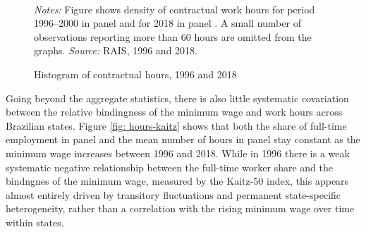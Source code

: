 \begin{figure}[!htb]
  \centering
  \caption{\label{fig: hours}Histogram of contractual hours, 1996 and 2018}
  \prefigvspace
  \\
  \postfigvspace
  \begin{minipage}[t]{1\columnwidth}%
    \begin{spacing}{0.75}
      \emph{\scriptsize{}Notes:}{\scriptsize{} Figure shows density of contractual
      work hours for period 1996--2000 in panel 
      and for 2018 in panel . A small number of observations
      reporting more than 60 hours are omitted from the graphs. %
      \emph{\scriptsize{}Source: } RAIS, 1996 and 2018.}
    \end{spacing}
  \end{minipage}
\end{figure}

Going beyond the aggregate statistics, there is also little systematic
covariation between the relative bindingness of the minimum wage and
work hours across Brazilian states. Figure \ref{fig: hours-kaitz}
shows that both the share of full-time employment in panel 
and the mean number of hours in panel 
stay constant as the minimum wage increases between 1996 and 2018.
While in 1996 there is a weak systematic negative relationship between
the full-time worker share and the bindngnes of the minimum wage,
measured by the Kaitz-50 index, this appears almost entirely driven by
transitory fluctuations and permanent state-specific heterogeneity,
rather than a correlation with the rising minimum wage over time within
states.


